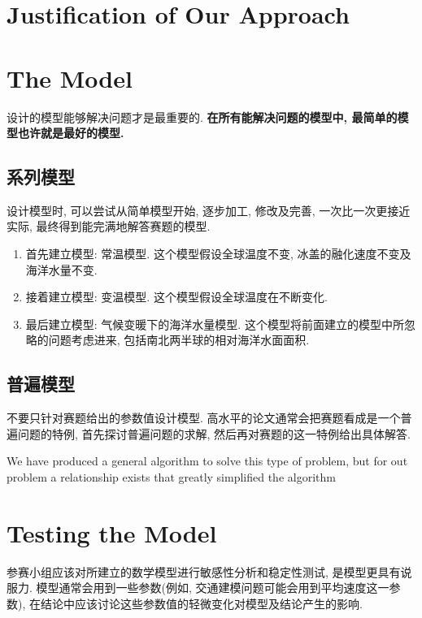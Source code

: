 \documentclass[openany]{ctexbook}
\newenvironment{example}{\begin{tcolorbox}[title=Example]}{\end{tcolorbox}}
\begin{document}
    \section{Justification of Our Approach}
    \lipsum[4]

    \section{The Model}
    设计的模型能够解决问题才是最重要的. \textbf{在所有能解决问题的模型中, 最简单的模型也许就是最好的模型.}
        \subsection{系列模型}
        设计模型时, 可以尝试从简单模型开始, 逐步加工, 修改及完善, 一次比一次更接近实际, 最终得到能完满地解答赛题的模型.
        \begin{example}
            \begin{enumerate}[(1)]
                \item 首先建立模型: 常温模型. 这个模型假设全球温度不变, 冰盖的融化速度不变及海洋水量不变.
                \item 接着建立模型: 变温模型. 这个模型假设全球温度在不断变化.
                \item 最后建立模型: 气候变暖下的海洋水量模型. 这个模型将前面建立的模型中所忽略的问题考虑进来, 包括南北两半球的相对海洋水面面积.
            \end{enumerate}
        \end{example}

        \subsection{普遍模型}
        不要只针对赛题给出的参数值设计模型. 高水平的论文通常会把赛题看成是一个普遍问题的特例, 首先探讨普遍问题的求解, 然后再对赛题的这一特例给出具体解答.
        \begin{example}
            We have produced a general algorithm to solve this type of problem, but for out problem a relationship exists that greatly simplified the algorithm
        \end{example}

    \section{Testing the Model}
    参赛小组应该对所建立的数学模型进行敏感性分析和稳定性测试, 是模型更具有说服力. 模型通常会用到一些参数(例如, 交通建模问题可能会用到平均速度这一参数), 在结论中应该讨论这些参数值的轻微变化对模型及结论产生的影响.
\end{document}

